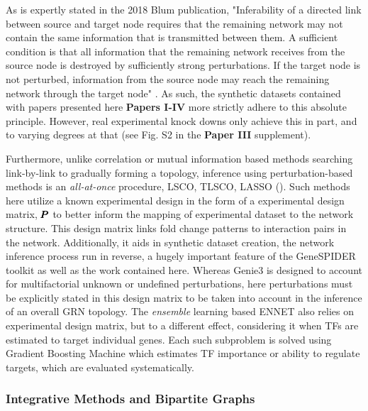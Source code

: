 As is expertly stated in the 2018 Blum \etal publication, "Inferability of a directed link between source and target node requires that the remaining network may not contain the same information that is transmitted between them. A sufficient condition is that all information that the remaining network receives from the source node is destroyed by sufficiently strong perturbations. If the target node is not perturbed, information from the source node may reach the remaining network through the target node" \cite{blum2018experimental}. As such, the synthetic datasets contained with papers presented here \textbf{Papers I-IV} more strictly adhere to this absolute principle. However, real experimental knock downs only achieve this in part, and to varying degrees at that (see Fig. S2 in the \textbf{Paper III} supplement).

Furthermore, unlike correlation or mutual information based methods searching link-by-link to gradually forming a topology, inference using perturbation-based methods is an {\it all-at-once} procedure, \ie LSCO, TLSCO, LASSO (). Such methods here utilize a known experimental design in the form of a experimental design matrix, \ie ${\pmb{P}}$ to better inform the mapping of experimental dataset to the network structure. This design matrix links fold change patterns to interaction pairs in the network. Additionally, it aids in synthetic dataset creation, the network inference process run in reverse, a hugely important feature of the GeneSPIDER toolkit as well as the work contained here. Whereas Genie3 is designed to account for multifactorial unknown or undefined perturbations, here perturbations must be explicitly stated in this design matrix to be taken into account in the inference of an overall GRN topology. 
The \emph{ensemble} learning based ENNET \citep{slawek2013ennet} also relies on experimental design matrix, but to a different effect, considering it when TFs are estimated to target individual genes. Each such subproblem is solved using Gradient Boosting Machine which estimates TF importance or ability to regulate targets, which are evaluated systematically.

\subsubsection{Integrative Methods and Bipartite Graphs}
\label{sec:bipart}

